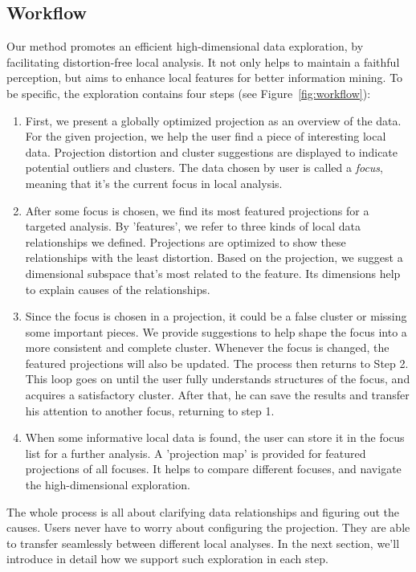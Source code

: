 \subsection{Workflow}
Our method promotes an efficient high-dimensional data exploration, by facilitating distortion-free local analysis. It not only helps to maintain a faithful perception, but aims to enhance local features for better information mining. To be specific, the exploration contains four steps (see Figure~\ref{fig:workflow}):
\begin{enumerate}[Step. 1:]
 \item First, we present a globally optimized projection as an overview of the data. For the given projection, we help the user find a piece of interesting local data. Projection distortion and cluster suggestions are displayed to indicate potential outliers and clusters. The data chosen by user is called a \emph{focus}, meaning that it's the current focus in local analysis.
 \item After some focus is chosen, we find its most featured projections for a targeted analysis. By 'features', we refer to three kinds of local data relationships we defined. Projections are optimized to show these relationships with the least distortion. Based on the projection, we suggest a dimensional subspace that's most related to the feature. Its dimensions help to explain causes of the relationships.
 \item Since the focus is chosen in a projection, it could be a false cluster or missing some important pieces. We provide suggestions to help shape the focus into a more consistent and complete cluster. Whenever the focus is changed, the featured projections will also be updated. The process then returns to Step 2. This loop goes on until the user fully understands structures of the focus, and acquires a satisfactory cluster. After that, he can save the results and transfer his attention to another focus, returning to step 1.
 \item When some informative local data is found, the user can store it in the focus list for a further analysis. A 'projection map' is provided for featured projections of all focuses. It helps to compare different focuses, and navigate the high-dimensional exploration.
\end{enumerate}
The whole process is all about clarifying data relationships and figuring out the causes. Users never have to worry about configuring the projection. They are able to transfer seamlessly between different local analyses. In the next section, we'll introduce in detail how we support such exploration in each step.